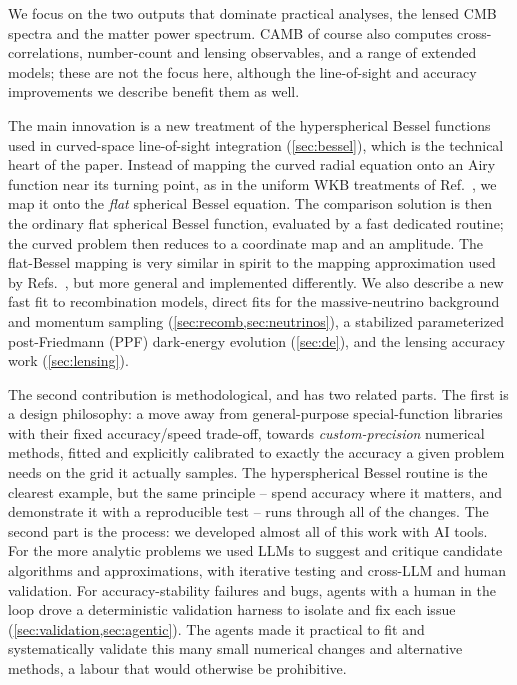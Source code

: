 \documentclass[prd, twocolumn, superscriptaddress, tightenlines, longbibliography, nofootinbib, eqsecnum, amsfonts, amsmath, floatfix, notitlepage]{revtex4-2}
\begin{document}
We focus on the two outputs that dominate practical analyses, the lensed
CMB spectra and the matter power spectrum. \textsc{CAMB} of course also computes
cross-correlations, number-count and lensing observables, and a range of
extended models; these are not the focus here, although the line-of-sight and
accuracy improvements we describe benefit them as well.

The main innovation is a new treatment of the hyperspherical Bessel
functions used in curved-space line-of-sight integration
(\cref{sec:bessel}), which is the technical heart of the paper. Instead of
mapping the curved radial equation onto an Airy function near its turning point,
as in the uniform WKB treatments of
Ref.~\cite{Kosowsky:1998nc}, we map it onto the
\emph{flat} spherical Bessel equation. The comparison solution is then the
ordinary flat spherical Bessel function, evaluated by a fast dedicated
routine; the curved problem then reduces to a coordinate
map and an amplitude. The flat-Bessel mapping is very similar in spirit to the
mapping approximation used by Refs.~\cite{tram2013,lesgourgues-tram2013}, but more general and implemented differently.
We also describe a new fast fit to recombination models, direct fits for the massive-neutrino background and
momentum sampling (\cref{sec:recomb,sec:neutrinos}), a stabilized parameterized
post-Friedmann (PPF) dark-energy evolution (\cref{sec:de}), and the lensing
accuracy work (\cref{sec:lensing}).

The second contribution is methodological, and has two related parts. The first
is a design philosophy: a move away from general-purpose special-function
libraries with their fixed accuracy/speed trade-off, towards
\emph{custom-precision} numerical methods, fitted and explicitly calibrated
to exactly the accuracy a given problem needs on the grid it actually samples. The
hyperspherical Bessel routine is the clearest example, but the same principle --
spend accuracy where it matters, and demonstrate it with a reproducible test -- runs
through all of the changes. The second part is the process: we developed almost
all of this work with AI tools. For the more analytic problems we used LLMs to
suggest and critique candidate algorithms and approximations, with iterative
testing and cross-LLM and human validation. For accuracy-stability failures and
bugs, agents with a human in the loop drove a deterministic validation harness to
isolate and fix each issue (\cref{sec:validation,sec:agentic}). The agents made it
practical to fit and systematically validate this many small numerical changes
and alternative methods, a labour that would otherwise be prohibitive.
\end{document}
